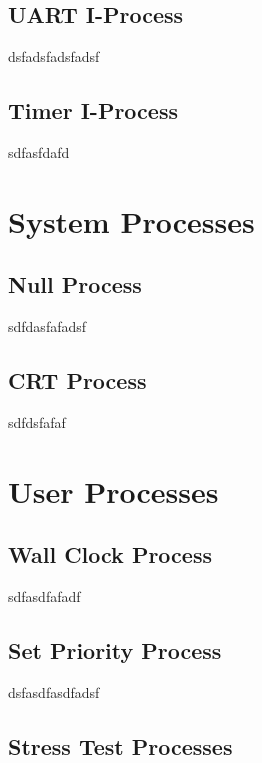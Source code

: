 \documentclass[12pt]{report}
\begin{document}
\subsection{UART I-Process}

dsfadsfadsfadsf

\subsection{Timer I-Process}

sdfasfdafd


\section{System Processes}

\subsection{Null Process}

sdfdasfafadsf

\subsection{CRT Process}

sdfdsfafaf


\section{User Processes}

\subsection{Wall Clock Process}

sdfasdfafadf

\subsection{Set Priority Process}

dsfasdfasdfadsf

\subsection{Stress Test Processes}
\end{document}
